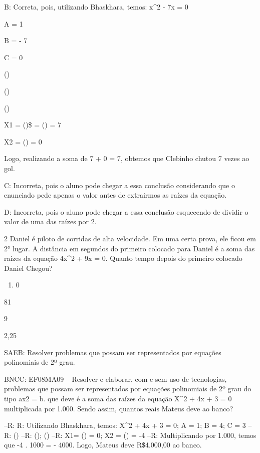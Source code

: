 {B: Correta, pois, utilizando Bhaskhara, temos:
x^2 - 7x = 0

A = 1

B = - 7

C = 0

()

()

()

X1 = ()\$ = () = 7

X2 = () = 0

Logo, realizando a soma de 7 + 0 = 7, obtemos que Clebinho chutou 7
vezes ao gol.

C: Incorreta, pois o aluno pode chegar a essa conclusão considerando que
o enunciado pede apenas o valor antes de extrairmos as raízes da
equação.

D: Incorreta, pois o aluno pode chegar a essa conclusão esquecendo de
dividir o valor de uma das raízes por 2.

\num{2} Daniel é piloto de corridas de alta velocidade. Em uma certa prova,
ele ficou em 2° lugar. A distância em segundos do primeiro colocado para
Daniel é a soma das raízes da equação 4x^2 + 9x = 0. Quanto tempo depois
do primeiro colocado Daniel Chegou?

\begin{enumerate}
\def\labelenumi{\alph{enumi})}
\tightlist
\item
  0
\end{enumerate}
\item 81
\item 9
\item 2,25

SAEB: Resolver problemas que possam ser representados por equações
polinomiais de 2º grau.

BNCC: EF08MA09 -- Resolver e elaborar, com e sem uso de tecnologias,
problemas que possam ser representados por equações polinomiais de 2º
grau do tipo ax2 = b.
que deve é a soma das raízes da equação X^2 + 4x + 3 = 0 multiplicada por
1.000. Sendo assim, quantos reais Mateus deve ao banco?

--R: R: Utilizando Bhaskhara, temos: X^2 + 4x + 3 = 0; A = 1; B = 4; C = 3
--R: ()
--R: (); ()
--R: X1= () = 0; X2 = () = -4
--R: Multiplicando por 1.000, temos que -4 . 1000 = - 4000. Logo, Mateus deve R\$4.000,00 ao banco.

}
